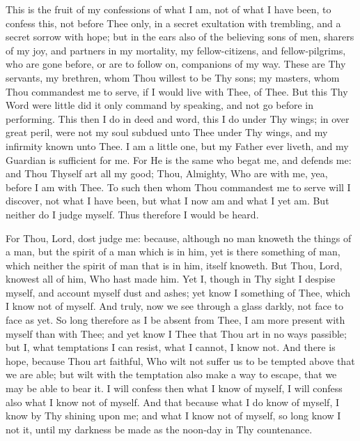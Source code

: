 \documentclass[b5paper,openright,12pt,twoside]{book}
\begin{document}
This is the fruit of my confessions of what I am, not of what I have
been, to confess this, not before Thee only, in a secret exultation with
trembling, and a secret sorrow with hope; but in the ears also of the
believing sons of men, sharers of my joy, and partners in my mortality,
my fellow-citizens, and fellow-pilgrims, who are gone before, or are to
follow on, companions of my way. These are Thy servants, my brethren,
whom Thou willest to be Thy sons; my masters, whom Thou commandest me to
serve, if I would live with Thee, of Thee. But this Thy Word were little
did it only command by speaking, and not go before in performing. This
then I do in deed and word, this I do under Thy wings; in over great
peril, were not my soul subdued unto Thee under Thy wings, and my
infirmity known unto Thee. I am a little one, but my Father ever liveth,
and my Guardian is sufficient for me. For He is the same who begat me,
and defends me: and Thou Thyself art all my good; Thou, Almighty,
Who are with me, yea, before I am with Thee. To such then whom Thou
commandest me to serve will I discover, not what I have been, but what I
now am and what I yet am. But neither do I judge myself. Thus therefore
I would be heard.

For Thou, Lord, dost judge me: because, although no man knoweth the
things of a man, but the spirit of a man which is in him, yet is there
something of man, which neither the spirit of man that is in him, itself
knoweth. But Thou, Lord, knowest all of him, Who hast made him. Yet I,
though in Thy sight I despise myself, and account myself dust and ashes;
yet know I something of Thee, which I know not of myself. And truly,
now we see through a glass darkly, not face to face as yet. So long
therefore as I be absent from Thee, I am more present with myself than
with Thee; and yet know I Thee that Thou art in no ways passible; but I,
what temptations I can resist, what I cannot, I know not. And there is
hope, because Thou art faithful, Who wilt not suffer us to be tempted
above that we are able; but wilt with the temptation also make a way to
escape, that we may be able to bear it. I will confess then what I
know of myself, I will confess also what I know not of myself. And that
because what I do know of myself, I know by Thy shining upon me; and
what I know not of myself, so long know I not it, until my darkness be
made as the noon-day in Thy countenance.
\end{document}
